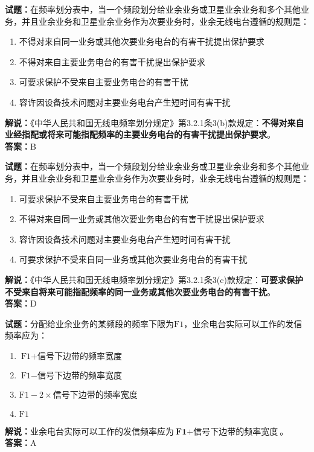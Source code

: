 \documentclass{ctexbook}
\begin{document}
\vspace{1em}

\textbf{试题：}在频率划分表中，当一个频段划分给业余业务或卫星业余业务和多个其他业务，并且业余业务和卫星业余业务作为次要业务时，业余无线电台遵循的规则是：
\begin{enumerate}[leftmargin=3em]
  \item 不得对来自同一业务或其他次要业务电台的有害干扰提出保护要求
  \item 不得对来自主要业务电台的有害干扰提出保护要求
  \item 可要求保护不受来自主要业务电台的有害干扰
  \item 容许因设备技术问题对主要业务电台产生短时间有害干扰
\end{enumerate}
\noindent\textbf{解说：}《中华人民共和国无线电频率划分规定》第3.2.1条3(b)款规定：\textbf{不得对来自业经指配或将来可能指配频率的主要业务电台的有害干扰提出保护要求}。\\\textbf{答案：}B

\vspace{1em}

\textbf{试题：}在频率划分表中，当一个频段划分给业余业务或卫星业余业务和多个其他业务，并且业余业务和卫星业余业务作为次要业务时，业余无线电台遵循的规则是：
\begin{enumerate}[leftmargin=3em]
  \item 可要求保护不受来自主要业务电台的有害干扰
  \item 不得对来自同一业务或其他次要业务电台的有害干扰提出保护要求
  \item 容许因设备技术问题对主要业务电台产生短时间有害干扰
  \item 可要求保护不受来自同一业务或其他次要业务电台的有害干扰
\end{enumerate}
\noindent\textbf{解说：}《中华人民共和国无线电频率划分规定》第3.2.1条3(c)款规定：\textbf{可要求保护不受来自将来可能指配频率的同一业务或其他次要业务电台的有害干扰}。\\\textbf{答案：}D

\vspace{1em}

\textbf{试题：}分配给业余业务的某频段的频率下限为\(\textrm{F1}\)，业余电台实际可以工作的发信频率应为：
\begin{enumerate}[leftmargin=3em]
  \item \(\textrm{F1} + \textrm{信号下边带的频率宽度}\)
  \item \(\textrm{F1} - \textrm{信号下边带的频率宽度}\)
  \item \(\textrm{F1} - 2 \times \textrm{信号下边带的频率宽度}\)
  \item \(\textrm{F1}\)
\end{enumerate}
\noindent\textbf{解说：}业余电台实际可以工作的发信频率应为\(\textbf{F1} + \textbf{信号下边带的频率宽度}\)。
\\\noindent\textbf{答案：}A
\end{document}

